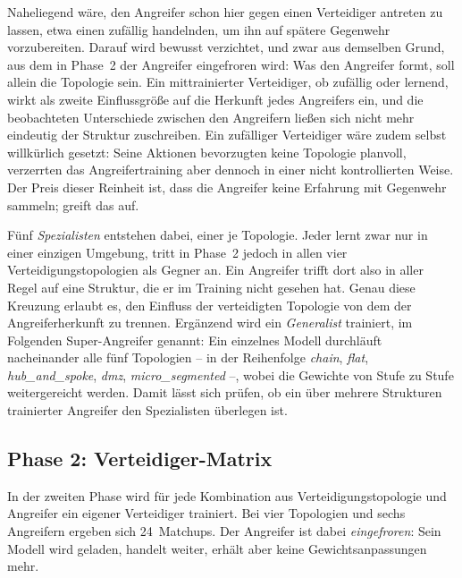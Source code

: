 Naheliegend wäre, den Angreifer schon hier gegen einen Verteidiger antreten zu
lassen, etwa einen zufällig handelnden, um ihn auf spätere Gegenwehr
vorzubereiten. Darauf wird bewusst verzichtet, und zwar aus demselben Grund, aus
dem in Phase~2 der Angreifer eingefroren wird: Was den Angreifer formt, soll
allein die Topologie sein. Ein mittrainierter Verteidiger, ob zufällig oder
lernend, wirkt als zweite Einflussgröße auf die Herkunft jedes Angreifers ein,
und die beobachteten Unterschiede zwischen den Angreifern ließen sich nicht mehr
eindeutig der Struktur zuschreiben. Ein zufälliger Verteidiger wäre zudem selbst
willkürlich gesetzt: Seine Aktionen bevorzugten keine Topologie planvoll,
verzerrten das Angreifertraining aber dennoch in einer nicht kontrollierten
Weise. Der Preis dieser Reinheit ist, dass die Angreifer keine Erfahrung mit
Gegenwehr sammeln;  greift das auf.

Fünf \emph{Spezialisten} entstehen dabei, einer je Topologie. Jeder lernt zwar
nur in einer einzigen Umgebung, tritt in Phase~2 jedoch in allen vier
Verteidigungstopologien als Gegner an. Ein Angreifer trifft dort also in aller
Regel auf eine Struktur, die er im Training nicht gesehen hat. Genau diese
Kreuzung erlaubt es, den Einfluss der verteidigten Topologie von dem der
Angreiferherkunft zu trennen. Ergänzend
wird ein \emph{Generalist} trainiert, im Folgenden Super-Angreifer genannt: Ein
einzelnes Modell durchläuft nacheinander alle fünf Topologien -- in der
Reihenfolge \emph{chain}, \emph{flat}, \emph{hub\_and\_spoke}, \emph{dmz},
\emph{micro\_segmented} --, wobei die Gewichte von Stufe zu Stufe
weitergereicht werden. Damit lässt sich prüfen, ob
ein über mehrere Strukturen trainierter Angreifer den Spezialisten überlegen
ist.

\subsection{Phase 2: Verteidiger-Matrix}

In der zweiten Phase wird für jede Kombination aus Verteidigungstopologie und
Angreifer ein eigener Verteidiger trainiert. Bei vier Topologien und sechs
Angreifern ergeben sich 24~Matchups. Der Angreifer ist dabei \emph{eingefroren}:
Sein Modell wird geladen, handelt weiter, erhält aber keine Gewichtsanpassungen
mehr.

